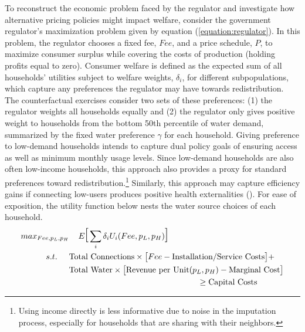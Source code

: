 \documentclass[12pt]{article}
\begin{document}
To reconstruct the economic problem faced by the regulator and investigate how alternative pricing policies might impact welfare, consider the government regulator's maximization problem given by equation (\ref{equation:regulator}).  In this problem, the regulator chooses a fixed fee, $Fee$, and a price schedule, $P$, to maximize consumer surplus while covering the costs of production (holding profits equal to zero).  Consumer welfare is defined as the expected sum of all households' utilities subject to welfare weights, $\delta_i$, for different subpopulations, which capture any preferences the regulator may have towards redistribution.  The counterfactual exercises consider two sets of these preferences: (1) the regulator weights all households equally and (2) the regulator only gives positive weight to households from the bottom 50th percentile of water demand, summarized by the fixed water preference $\gamma$ for each household.  Giving preference to low-demand households intends to capture dual policy goals of ensuring access as well as minimum monthly usage levels.  Since low-demand households are also often low-income households, this approach also provides a proxy for standard preferences toward redistribution.\footnote{Using income directly is less informative due to noise in the imputation process, especially for households that are sharing with their neighbors.}  Similarly, this approach may capture efficiency gains if connecting low-users produces positive health externalities (\cite{galiani2005water,gamper2010impact}).  For ease of exposition, the utility function below nests the water source choices of each household.
\begin{align}
\begin{split}
max_{Fee,p_{L},p_{H}} &\hspace{.4cm} E\text{\LARGE [} \sum_{i} \delta_i U_{i}(Fee,p_{L},p_{H}) \text{\LARGE ]} \\
s.t. \hspace{.5cm} & \text{Total Connections} \times \big[ Fee - \text{Installation/Service Costs} \big] + \\
              & \text{Total Water} \times \big[ \text{Revenue per Unit}(p_{L},p_{H})  - \text{Marginal Cost}  \big] \\
      & \hspace{5.5cm} \geq \text{Capital Costs}
\end{split}
\label{equation:regulator}
\end{align}
\end{document}
